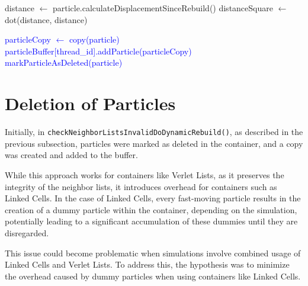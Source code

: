 
\vspace{40pt}

\begin{algorithm}
\label{alg:neighborlists}
  \begin{algorithmic}[1]
       

        \State 
        \State distance $\gets$ particle.calculateDisplacementSinceRebuild()
        \State distanceSquare $\gets$ dot(distance, distance) 

        \State 
            \State 
            \State \textcolor{blue}{particleCopy $\gets$ copy(particle)}
            \State \textcolor{blue}{particleBuffer[thread\_id].addParticle(particleCopy)}
            \State \textcolor{blue}{markParticleAsDeleted(particle)}

        \State 
        \EndIf
      \EndFor
  \EndProcedure
  \end{algorithmic}
\end{algorithm}
  




\clearpage
\section{Deletion of Particles}

Initially, in \texttt{checkNeighborListsInvalidDoDynamicRebuild()}, as described in the previous subsection, particles were marked as deleted in the container, and a copy was created and added to the buffer.  

While this approach works for containers like Verlet Lists, as it preserves the integrity of the neighbor lists, it introduces overhead for containers such as Linked Cells. In the case of Linked Cells, every fast-moving particle results in the creation of a dummy particle within the container, depending on the simulation, potentially leading to a significant accumulation of these dummies until they are disregarded. 

This issue could become problematic when simulations involve combined usage of Linked Cells and Verlet Lists. To address this, the hypothesis was to minimize the overhead caused by dummy particles when using containers like Linked Cells.

